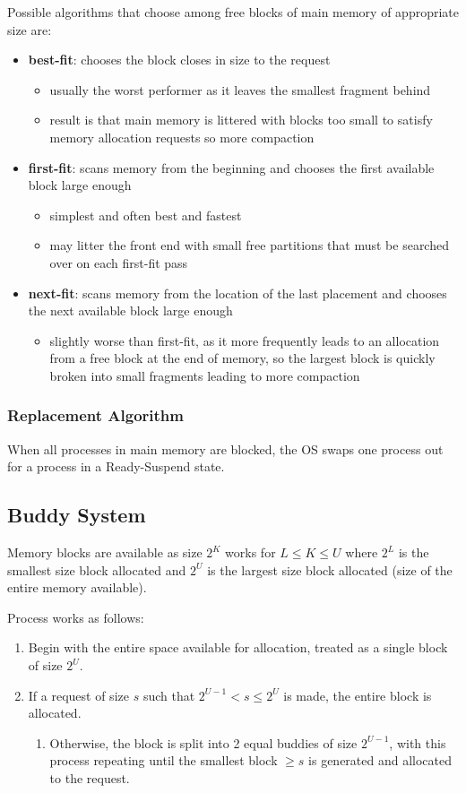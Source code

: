 \documentclass[11pt]{article}
\begin{document}
Possible algorithms that choose among free blocks of main memory of appropriate
size are:
\begin{itemize}
\item \textbf{best-fit}: chooses the block closes in size to the request
\begin{itemize}
\item usually the worst performer as it leaves the smallest fragment behind
\item result is that main memory is littered with blocks too small to satisfy
memory allocation requests so more compaction
\end{itemize}
\item \textbf{first-fit}: scans memory from the beginning and chooses the first available
block large enough
\begin{itemize}
\item simplest and often best and fastest
\item may litter the front end with small free partitions that must be searched
over on each first-fit pass
\end{itemize}
\item \textbf{next-fit}: scans memory from the location of the last placement and chooses
the next available block large enough
\begin{itemize}
\item slightly worse than first-fit, as it more frequently leads to an allocation
from a free block at the end of memory, so the largest block is quickly
broken into small fragments leading to more compaction
\end{itemize}
\end{itemize}
\subsubsection{Replacement Algorithm}
\label{sec:org6c6637b}
When all processes in main memory are blocked, the OS swaps one process out
for a process in a Ready-Suspend state.
\subsection{Buddy System}
\label{sec:org7c2669c}
Memory blocks are available as size \(2^{K}\) works for \(L \le K \le U\) where
\(2^{L}\) is the smallest size block allocated and \(2^{U}\) is the largest size
block allocated (size of the entire memory available).

Process works as follows:
\begin{enumerate}
\item Begin with the entire space available for allocation, treated as a single
block of size \(2^{U}\).
\item If a request of size \(s\) such that \(2^{U-1} < s \le 2^{U}\) is made, the entire
block is allocated.
\begin{enumerate}
\item Otherwise, the block is split into 2 equal buddies of size \(2^{U-1}\),
with this process repeating until the smallest block \(\ge s\) is generated
and allocated to the request.
\end{enumerate}
\end{enumerate}
\end{document}
